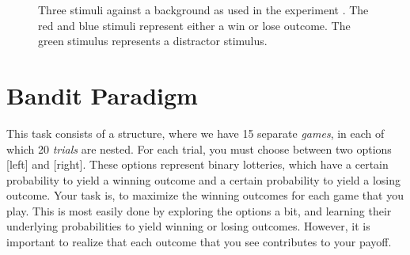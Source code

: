 \documentclass[12pt, oneside]{scrartcl}
\begin{document}
\pagebreak


\begin{figure}[h!]
\begin{center}

\captionsetup{width=.9\linewidth, format=plain}
\caption[Experimental Stimuli]{Three stimuli against a background as used in the experiment . The red and blue stimuli represent either a win or lose outcome. The green stimulus represents a distractor stimulus.}
\label{fig:stimuli}
\end{center}
\end{figure}





\pagebreak
\section{Bandit Paradigm}

This task consists of a structure, where we have 15 separate \textit{games}, in each of which 20 \textit{trials} are nested. For each trial, you must choose between two options [left] and [right]. These options represent binary lotteries, which have a certain probability to yield a winning outcome and a certain probability to yield a losing outcome. Your task is, to maximize the winning outcomes for each game that you play. This is most easily done by exploring the options a bit, and learning their underlying probabilities to yield winning or losing outcomes. However, it is important to realize that each outcome that you see contributes to your payoff.  \vspace{\baselineskip}
\end{document}
